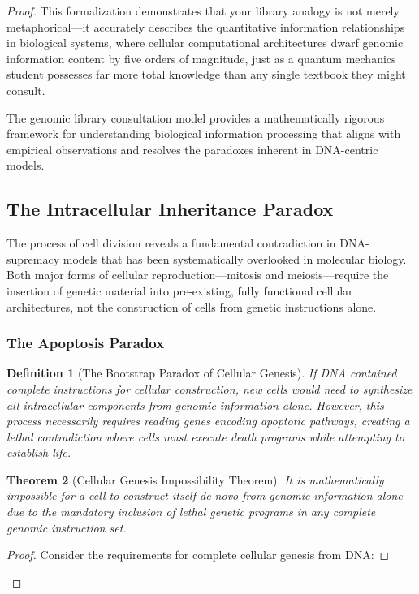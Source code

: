 \documentclass[12pt,a4paper]{article}
\newtheorem{theorem}{Theorem}[section]
\newtheorem{definition}[theorem]{Definition}
\begin{document}
\begin{proof}
This formalization demonstrates that your library analogy is not merely metaphorical—it accurately describes the quantitative information relationships in biological systems, where cellular computational architectures dwarf genomic information content by five orders of magnitude, just as a quantum mechanics student possesses far more total knowledge than any single textbook they might consult.

The genomic library consultation model provides a mathematically rigorous framework for understanding biological information processing that aligns with empirical observations and resolves the paradoxes inherent in DNA-centric models.

\subsection{The Intracellular Inheritance Paradox}

The process of cell division reveals a fundamental contradiction in DNA-supremacy models that has been systematically overlooked in molecular biology. Both major forms of cellular reproduction—mitosis and meiosis—require the insertion of genetic material into pre-existing, fully functional cellular architectures, not the construction of cells from genetic instructions alone.

\subsubsection{The Apoptosis Paradox}

\begin{definition}[The Bootstrap Paradox of Cellular Genesis]
If DNA contained complete instructions for cellular construction, new cells would need to synthesize all intracellular components from genomic information alone. However, this process necessarily requires reading genes encoding apoptotic pathways, creating a lethal contradiction where cells must execute death programs while attempting to establish life.
\end{definition}

\begin{theorem}[Cellular Genesis Impossibility Theorem]
It is mathematically impossible for a cell to construct itself de novo from genomic information alone due to the mandatory inclusion of lethal genetic programs in any complete genomic instruction set.
\end{theorem}

\begin{proof}
Consider the requirements for complete cellular genesis from DNA:


\end{proof}
\end{proof}
\end{document}
